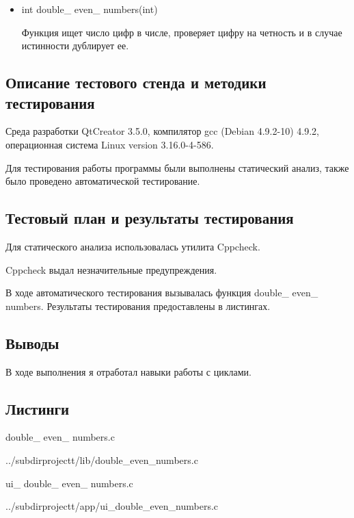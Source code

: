 \documentclass[12pt,a4paper]{report}
\begin{document}
\begin{itemize}
	\item int double\_ even\_ numbers(int)

	Функция ищет число цифр в числе, проверяет цифру на четность и в случае истинности дублирует ее.
\end{itemize}


\subsection{Описание тестового стенда и методики тестирования}

Среда разработки QtCreator 3.5.0, компилятор gcc (Debian 4.9.2-10) 4.9.2, операционная система Linux version 3.16.0-4-586.

Для тестирования работы программы были выполнены статический анализ, также было проведено автоматической тестирование.

\subsection{Тестовый план и результаты тестирования}

	Для статического анализа использовалась утилита Cppcheck.
	
	\vspace{\baselineskip}
	 Cppcheck выдал незначительные предупреждения.
	
	

	\vspace{\baselineskip}
	
	В ходе автоматического тестирования  вызывалась функция double\_ even\_ numbers. Результаты тестирования предоставлены в листингах.
	 \vspace{\baselineskip}
 

\subsection{Выводы}
В ходе выполнения я отработал навыки работы с циклами.
\subsection*{Листинги}
double\_ even\_ numbers.c

{../subdirprojectt/lib/double_even_numbers.c}

\vspace{\baselineskip}

ui\_ double\_ even\_ numbers.c

{../subdirprojectt/app/ui_double_even_numbers.c}
\end{document}
